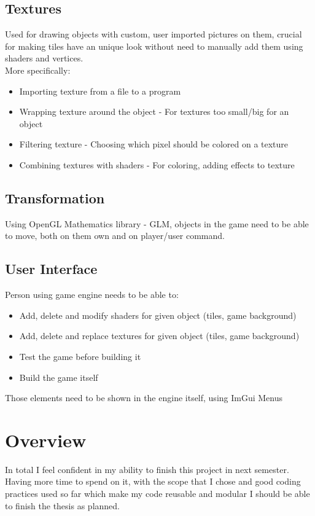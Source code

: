 \documentclass[12pt]{article}
\begin{document}
\subsection{Textures}
Used for drawing objects with custom, user imported pictures on them, crucial for making tiles have an unique look without need to manually add them using shaders and vertices. \\
More specifically:
\begin{itemize}
    \item Importing texture from a file to a program
    \item Wrapping texture around the object - For textures too small/big for an object  
    \item Filtering texture - Choosing which pixel should be colored on a texture 
    \item Combining textures with shaders - For coloring, adding effects to texture
\end{itemize}
\subsection{Transformation} 
Using OpenGL Mathematics library - GLM, objects in the game need to be able to move, both on them own and on player/user command. 
\subsection{User Interface}
Person using game engine needs to be able to:
\begin{itemize}
    \item Add, delete and modify shaders for given object (tiles, game background)
    \item Add, delete and replace textures for given object (tiles, game background)
    \item Test the game before building it
    \item Build the game itself 
\end{itemize}
Those elements need to be shown in the engine itself, using ImGui Menus

\section{Overview}
In total I feel confident in my ability to finish this project in next semester. \\ Having more time to spend on it, with the scope that I chose and good coding practices used so far which make my code reusable and modular I should be able to finish the thesis as planned.
\end{document}
